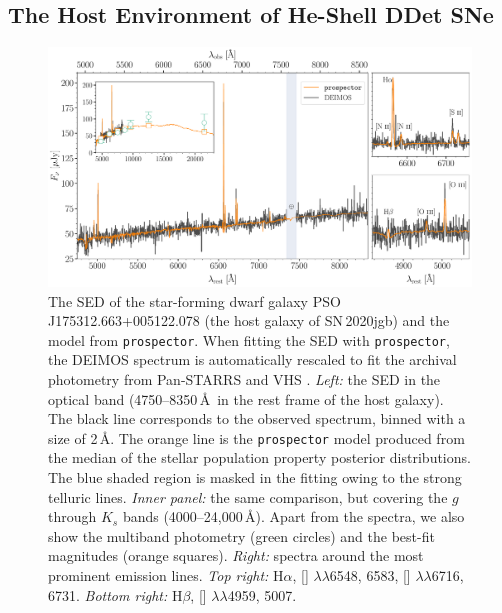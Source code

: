 \documentclass[twocolumn]{aastex631}
\newcommand{\sn}{SN\,2020jgb}
\begin{document}
\subsection{The Host Environment of He-Shell DDet SNe} \label{sec:host}
\begin{figure}
    \centering
    \includegraphics[width=\textwidth]{DEIMOS_20jgb.pdf}
    \caption{The SED of the star-forming dwarf galaxy PSO J175312.663+005122.078 (the host galaxy of \sn) and the model from \texttt{prospector}. When fitting the SED with \texttt{prospector}, the DEIMOS spectrum is automatically rescaled to fit the archival photometry from Pan-STARRS \citep[][$g$, $r$, $i$, $z$, $y$ Kron magnitudes]{PS1_2016} and VHS \citep[][$J$ and $K_s$ Petrosian magnitudes]{VHS_2013}. {\it Left:} the SED in the optical band (4750--8350\,\AA\ in the rest frame of the host galaxy). The black line corresponds to the observed spectrum, binned with a size of 2\,\AA. The orange line is the \texttt{prospector} model produced from the median of the stellar population property posterior distributions. The blue shaded region is masked in the fitting owing to the strong telluric lines. {\it Inner panel:} the same comparison, but covering the $g$ through $K_s$ bands (4000--24,000\,\AA). Apart from the spectra, we also show the multiband photometry (green circles) and the best-fit magnitudes (orange squares). {\it Right:} spectra around the most prominent emission lines. {\it Top right:} H$\alpha$, [] $\lambda\lambda$6548, 6583, [] $\lambda\lambda$6716, 6731. {\it Bottom right:} H$\beta$, [] $\lambda\lambda$4959, 5007.}
    \label{fig:host_spec}
\end{figure}
\end{document}
